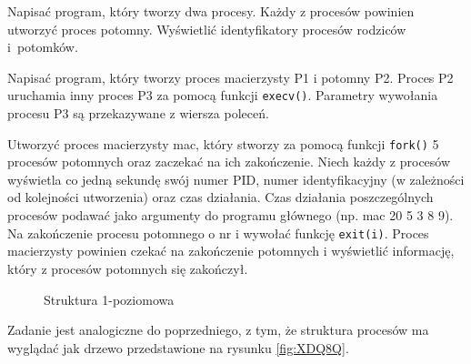 \begin{myenumerate}
  \item Napisać program, który tworzy dwa procesy. Każdy z procesów powinien
        utworzyć proces potomny. Wyświetlić identyfikatory procesów rodziców
        i~potomków.
  \item Napisać program, który tworzy proces macierzysty P1 i  potomny P2.
        Proces P2 uruchamia inny proces P3 za pomocą funkcji \texttt{execv()}.
        Parametry wywołania procesu P3 są przekazywane z wiersza poleceń.
  \item Utworzyć proces macierzysty mac, który stworzy za pomocą funkcji
        \texttt{fork()} 5 procesów potomnych oraz zaczekać na ich zakończenie.
        Niech każdy z procesów wyświetla co jedną sekundę swój numer PID, numer
        identyfikacyjny (w zależności od kolejności utworzenia) oraz czas
        działania. Czas działania poszczególnych procesów podawać jako
        argumenty do programu głównego (np.  mac 20 5 3 8 9). Na zakończenie
        procesu potomnego o nr i wywołać funkcję \texttt{exit(i)}. Proces
        macierzysty powinien czekać na zakończenie potomnych i wyświetlić
        informację, który z procesów potomnych się zakończył.
        \begin{figure}[htbp]
          \centering
          \caption{Struktura 1-poziomowa}
          \label{fig:YT6VA}
        \end{figure}

  \item Zadanie jest analogiczne do poprzedniego, z tym, że struktura procesów
        ma wyglądać jak drzewo przedstawione na rysunku \ref{fig:XDQ8Q}.
        \begin{figure}[ht]
          \centering
\end{figure}
\end{myenumerate}
